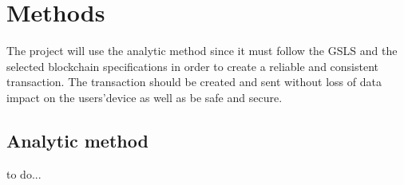 \section{Methods}
\label{S:4}


The project will use the analytic method since it must follow the GSLS and the selected blockchain specifications in order to create a reliable and consistent transaction. The transaction should
be created and sent without loss of data impact on the users’device as well as be safe and secure.

\subsection{Analytic method}

to do... 